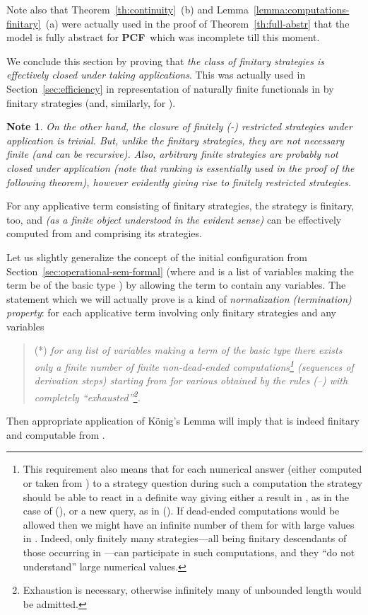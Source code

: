 \documentclass[fleqn]{LMCS}
\theoremstyle{plain}\newtheorem{satz}[thm]{Satz}
\theoremstyle{plain}\newtheorem{hyp}[thm]{Hypothesis}
\theoremstyle{plain}\newtheorem{hyps}[thm]{Hypotheses}
\theoremstyle{definition}\newtheorem{note}[thm]{Note}
\newcommand{\PCF}{\mbox{\bf PCF}}
\newcommand{\?}{\mbox{?}}
\begin{document}
\noindent
Note also that Theorem~\ref{th:continuity}~(b)  
and Lemma~\ref{lemma:computations-finitary}~(a) were 
actually used in the proof of Theorem~\ref{th:full-abstr} 
that the model  is fully abstract for \PCF\ 
which was incomplete till this moment. 



\medskip

We conclude this section by proving that \emph{the class of finitary strategies 
is effectively closed under taking applications}. This was actually used in  
Section~\ref{sec:efficiency} in representation of naturally finite functionals 
in  by finitary strategies (and, similarly, for ). 
\begin{note}\label{note:closure-under-appl-of-finite-strategies}\em
On the other hand, the closure of finitely (-) restricted strategies under 
application is trivial. But, unlike the finitary strategies, they are not necessary finite 
(and can be recursive). Also, \emph{arbitrary finite strategies are 
probably not closed under application} 
(note that ranking is essentially used in the proof of the following theorem), 
however evidently giving rise to finitely restricted strategies. 
\end{note}

\begin{thm}\label{th:applications-of-finitary}
For any applicative term  consisting of finitary strategies, the strategy 
 is finitary, too, and\/ {\em(as a finite object understood in the evident sense)} 
can be effectively computed from  and 
comprising its strategies. 
\end{thm}
\proof 
Let us slightly generalize the concept of the initial configuration  
from Section~\ref{sec:operational-sem-formal} 
(where  and  is a list of variables making the term  
be of the basic type ) 
by allowing the term  to contain any variables.  
The statement which we will actually prove is a kind of 
\emph{normalization (termination) property}: 
for each applicative term  involving only finitary strategies 
and any variables 
\begin{quotation}
(*) \emph{ for any list of variables  making  a term of the basic type 
there exists only a finite number of finite non-dead-ended computations\footnote{This requirement also means that for each numerical answer 
(either computed or taken from ) 
to a strategy question during such a computation the strategy should be able 
to react in a definite way 
giving either a result in , as in the case of 
(), or a new query, as in (). 
If dead-ended computations would be allowed then we might have an infinite number of them 
for  with large values in . 
Indeed, only finitely many strategies---all being finitary descendants 
of those occurring in ---can participate in such computations, 
and they ``do not understand'' large numerical values. 
}
(sequences of derivation steps) starting from 
\mbox{} for various 
 obtained by the rules (--) with  completely ``exhausted''\footnote{Exhaustion 
is necessary, otherwise infinitely many  
of unbounded length would be admitted.
}. 
}
\end{quotation}
Then appropriate application of K\"onig's Lemma will imply that  is indeed 
finitary and computable from . 
\end{document}
